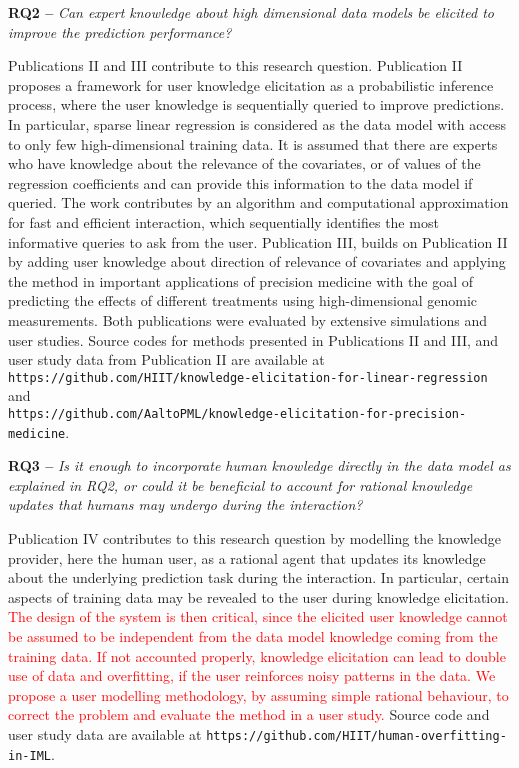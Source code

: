 \documentclass[dissertation,math,vertlayout,pdfa,colorlinks]{aaltoseries}
\begin{document}
\noindent \textbf{RQ2 --} \textit{Can expert knowledge about high dimensional data models be elicited to improve the prediction performance?}

Publications II and III contribute to this research question. Publication II proposes a framework for user knowledge elicitation as a probabilistic inference process, where the user knowledge is sequentially queried to improve predictions. In particular, sparse linear regression is considered as the data model with access to only few high-dimensional training data. It is assumed that there are experts who have knowledge about the relevance of the covariates, or of values of the regression coefficients and can provide this information to the data model if queried. The work contributes by an algorithm and computational approximation for fast and efficient interaction, which sequentially identifies the most informative queries to ask from the user. Publication III, builds on Publication II by adding user knowledge about direction of relevance of covariates and applying the method in important applications of precision medicine with the goal of predicting the effects of different treatments using high-dimensional genomic measurements. Both publications were evaluated by extensive simulations and user studies. 
Source codes for methods presented in Publications II and III, and user study data from Publication II are available at \\ \texttt{https://github.com/HIIT/knowledge-elicitation-for-linear-regression} and \\ \texttt{https://github.com/AaltoPML/knowledge-elicitation-for-precision-medicine}.




\noindent \textbf{RQ3 --} \textit{Is it enough to incorporate human knowledge directly in the data model as explained in RQ2, or could it be beneficial to account for rational knowledge updates that humans may undergo during the interaction?}

Publication IV contributes to this research question by modelling the knowledge provider, here the human user, as a rational agent that updates its knowledge about the underlying prediction task during the interaction. In particular, certain aspects of training data may be revealed to the user during knowledge elicitation. \textcolor{red}{The design of the system is then critical, since the elicited user knowledge cannot be assumed to be independent from the data model knowledge coming from the training data. If not accounted properly, knowledge elicitation can lead to double use of data and overfitting, if the user reinforces noisy patterns in the data. We propose a user modelling methodology, by assuming simple rational behaviour, to correct the problem and evaluate the method in a user study.} 
Source code and user study data are available at \texttt{https://github.com/HIIT/human-overfitting-in-IML}.
\end{document}
